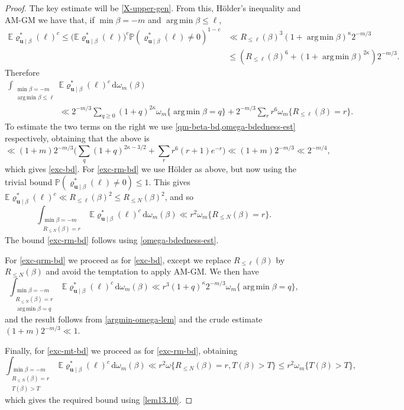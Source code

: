 \documentclass[11pt,reqno]{amsart}
\DeclareMathOperator*{\argmin}{arg\,min}
\numberwithin{equation}{section}
\theoremstyle{definition}
\theoremstyle{remark}
\newcommand{\mb}{\mathbb}
\newcommand{\mbf}{\mathbf}
\renewcommand{\le}{\leqslant}
\renewcommand{\ge}{\geqslant}
\begin{document}
\begin{proof} The key estimate will be \cref{X-upper-gen}. From this, H\"older's inequality and AM-GM we have that, if $\min \beta = -m$ and $\argmin \beta \le \ell$, \begin{align*} \mb{E} \varrho^*_{\mbf{u} \mid \beta}(\ell)^{c}   \le \big( \mb{E}\varrho^*_{\mbf{u} \mid \beta}(\ell)\big)^c \mb{P}(\varrho^*_{\mbf{u} \mid \beta}(\ell) \ne 0)^{1 - c} &  \ll R_{\le \ell}(\beta)^{3} (1 + \argmin \beta)^{\kappa} 2^{-m/3} \\ & \le (R_{\le \ell}(\beta)^{6} + (1+ \argmin \beta)^{2\kappa}) 2^{-m/3}. \end{align*} Therefore 
\begin{align*} \int_{\substack{\min \beta = -m \\ \argmin \beta \le \ell}} & \mb{E} \varrho^*_{\mbf{u} \mid \beta}(\ell)^c\, \mathrm{d}\omega_m(\beta) \\ &  \ll 2^{-m/3} \sum_{q \ge 0} (1 + q)^{2\kappa} \omega_m \{\argmin \beta = q\}  +  2^{-m/3} \sum_r r^{6} \omega_m\{ R_{\le \ell}(\beta) = r\}.   \end{align*}
To estimate the two terms on the right we use \cref{qm-beta-bd,omega-bdedness-est} respectively, obtaining that the above is 
\[ \ll (1 + m) 2^{-m/3} \big( \sum_q (1 + q)^{2\kappa - 3/2} + \sum_r r^{6}(r +1)e^{-r} \big) \ll (1 + m) 2^{-m/3} \ll 2^{-m/4}, \] which gives \cref{exc-bd}.
For \cref{exc-rm-bd} we use H\"older as above, but now using the trivial bound $\mb{P}(\varrho^*_{\mbf{u} \mid \beta}(\ell) \ne 0) \le 1$. This gives $\mb{E} \varrho^*_{\mbf{u} \mid \beta}(\ell)^c \ll R_{\le \ell}(\beta)^{2} \le R_{\le N}(\beta)^2$, and so 
\[\int_{\substack{\min \beta = -m \\ R_{\le N}(\beta) = r}} \mb{E} \varrho^*_{\mbf{u} \mid \beta}(\ell)^c\, \mathrm{d}\omega_m(\beta) \ll r^{2}\omega_m \{  R_{\le N}(\beta) = r \}.\]
The bound \cref{exc-rm-bd} follows using \cref{omega-bdedness-est}.

For \cref{exc-qrm-bd} we proceed as for \cref{exc-bd}, except we replace $R_{\le \ell}(\beta)$ by $R_{\le N}(\beta)$ and avoid the temptation to apply AM-GM. We then have
\[ \int_{\substack{\min \beta = -m \\ R_{\le N}(\beta) = r \\ \argmin \beta = q}} \mb{E} \varrho^*_{\mbf{u} \mid \beta}(\ell)^c\, \mathrm{d}\omega_m(\beta) \ll r^{3} (1 + q)^{\kappa}2^{-m/3} \omega_m \{ \argmin \beta = q\},\] and the result follows from \cref{argmin-omega-lem} and the crude estimate $(1 + m) 2^{-m/3} \ll 1$.

Finally, for \cref{exc-mt-bd} we proceed as for \cref{exc-rm-bd}, obtaining
\[ \int_{\substack{\min \beta = -m \\ R_{\le N}(\beta) = r \\ T(\beta) > T}} \mb{E} \varrho^*_{\mbf{u} \mid \beta}(\ell)^c\, \mathrm{d}\omega_m(\beta) \ll r^{2}\omega\{ R_{\le N}(\beta) = r, T(\beta) > T\} \le r^{2} \omega_m\{ T(\beta) > T\}, \] which gives the required bound using \cref{lem13.10}.
\end{proof}
\end{document}
